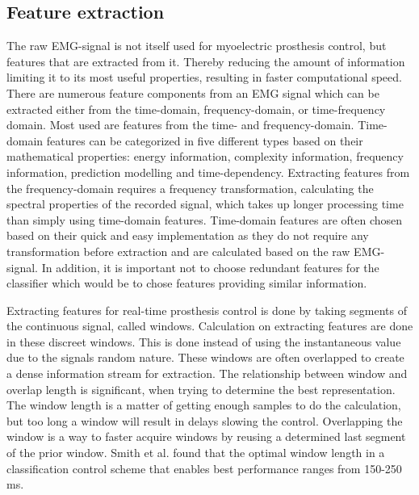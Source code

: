 
\subsection{Feature extraction} \label{sub:BG:featureExtraction} %

The raw EMG-signal is not itself used for myoelectric prosthesis control, but features that are extracted from it. Thereby reducing the amount of information limiting it to its most useful properties, resulting in faster computational speed. \\
There are numerous feature components from an EMG signal which can be extracted either from the time-domain, frequency-domain, or time-frequency domain. Most used are features from the time- and frequency-domain. Time-domain features can be categorized in five different types based on their mathematical properties: energy information, complexity information, frequency information, prediction modelling and time-dependency. Extracting features from the frequency-domain requires a frequency transformation, calculating the spectral properties of the recorded signal, which takes up longer processing time than simply using time-domain features. 
Time-domain features are often chosen based on their quick and easy implementation as they do not require any transformation before extraction and are calculated based on the raw EMG-signal. In addition, it is important not to choose redundant features for the classifier which would be to chose features providing similar information. \cite{Phiny2012} 

Extracting features for real-time prosthesis control is done by taking segments of the continuous signal, called windows. Calculation on extracting features are done in these discreet windows. This is done instead of using the instantaneous value due to the signals random nature. These windows are often overlapped to create a dense information stream for extraction. The relationship between window and overlap length is significant, when trying to determine the best representation. The window length is a matter of getting enough samples to do the calculation, but too long a window will result in delays slowing the control. Overlapping the window is a way to faster acquire windows by reusing a determined last segment of the prior window. Smith et al. \cite{Smith2014} found that the optimal window length in a classification control scheme that enables best performance ranges from 150-250 ms. 
